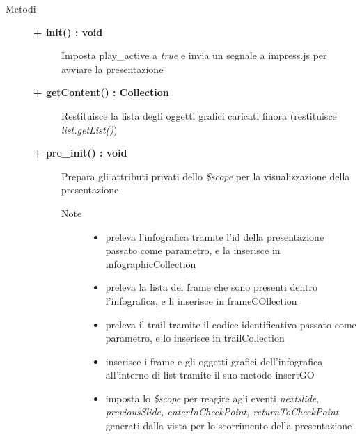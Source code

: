 \begin{description}
	
\item[Metodi] \hfill

	\begin{description}
		\item[\textbf{\color{blue}+ init() : void			}] \hfill
			Imposta play\_active a \textit{true} e invia un segnale a impress.js per avviare la presentazione
			
	\end{description}
	
	\begin{description}
		\item[\textbf{\color{blue}+ getContent() : Collection			}] \hfill
			Restituisce la lista degli oggetti grafici caricati finora (restituisce \textit{list.getList()})
			
	\end{description}
	
	\begin{description}
		\item[\textbf{\color{blue}+ pre\_init() : void			}] \hfill
			Prepara gli attributi privati dello \textit{\$scope} per la visualizzazione della presentazione
			
		\begin{description}
			\item[Note] \hfill
			\begin{itemize}
					\item preleva l'infografica tramite l'id della presentazione passato come parametro, e la inserisce in infographicCollection
					\item preleva la lista dei frame che sono presenti dentro l'infografica, e li inserisce in frameCOllection
					\item preleva il trail tramite il codice identificativo passato come parametro, e lo inserisce in trailCollection
					\item inserisce i frame e gli oggetti grafici dell'infografica all'interno di list tramite il suo metodo insertGO
					\item imposta lo \textit{\$scope} per reagire agli eventi \textit{nextslide, previousSlide, enterInCheckPoint, returnToCheckPoint} generati dalla vista per lo scorrimento della presentazione
			\end{itemize}
		\end{description}
	\end{description}

\end{description}









